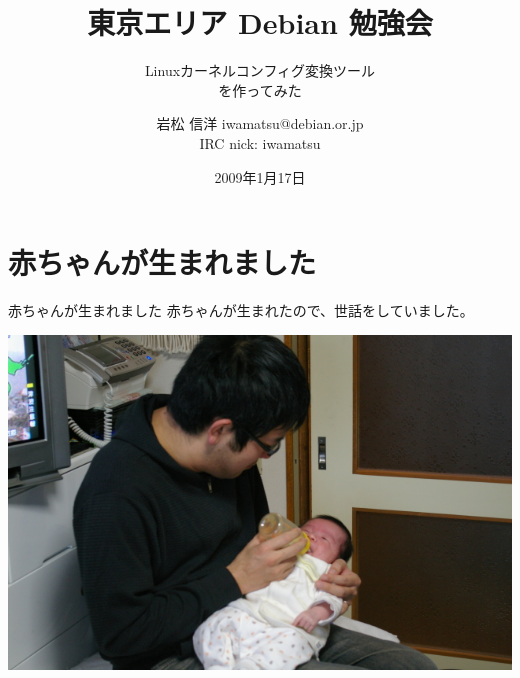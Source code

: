 \title{東京エリア Debian 勉強会}
\subtitle{Linuxカーネルコンフィグ変換ツール\\を作ってみた}
\author{岩松 信洋 iwamatsu@debian.or.jp\\IRC nick: iwamatsu}
\date{2009年1月17日}



\frame{\titlepage{}}


\section{赤ちゃんが生まれました}
\begin{frame}[containsverbatim]{赤ちゃんが生まれました}
赤ちゃんが生まれたので、世話をしていました。
 \begin{center}
 \includegraphics[scale=0.5]{image200901/baby.jpg}
 \label{fig:baby}
 \end{center}
\end{frame}

